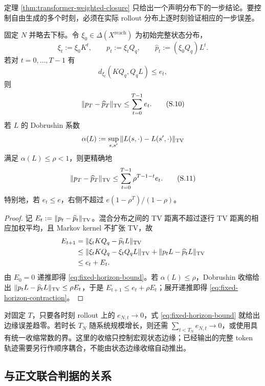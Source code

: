 定理 \ref{thm:transformer-weighted-closure} 只给出一个声明分布下的一步结论。要控制自由生成的多个时刻，必须在实际 rollout 分布上逐时刻验证相应的一步误差。

\begin{proposition}[固定时长的宏观状态边缘]
\label{prop:transformer-fixed-horizon}
固定 $N$ 并略去下标。令 $\xi_0\in\Delta(X^{\mathrm{reach}})$ 为初始完整状态分布，
\[
 \xi_t:=\xi_0K^t,
 \qquad p_t:=\xi_tQ_q,
 \qquad \widehat p_t:=(\xi_0Q_q)L^t.
\]
若对 $t=0,\ldots,T-1$ 有
\[
 d_{\xi_t}(KQ_q,Q_qL)\le e_t,
 \tag{S.9}\label{eq:rollout-one-step}
\]
则
\[
 \|p_T-\widehat p_T\|_{\operatorname{TV}}
 \le\sum_{t=0}^{T-1}e_t.
 \tag{S.10}\label{eq:fixed-horizon-bound}
\]
若 $L$ 的 Dobrushin 系数
\[
 \alpha(L):=\sup_{s,s'}\|L(s,\cdot)-L(s',\cdot)\|_{\operatorname{TV}}
\]
满足 $\alpha(L)\le\rho<1$，则更精确地
\[
 \|p_T-\widehat p_T\|_{\operatorname{TV}}
 \le\sum_{t=0}^{T-1}\rho^{T-1-t}e_t.
 \tag{S.11}\label{eq:fixed-horizon-contraction}
\]
特别地，若 $e_t\le e$，右侧不超过
$e(1-\rho^T)/(1-\rho)$。
\end{proposition}

\begin{proof}
记 $E_t:=\|p_t-\widehat p_t\|_{\operatorname{TV}}$。混合分布之间的 TV 距离不超过逐行 TV 距离的相应加权平均，且 Markov kernel 不扩张 TV，故
\[
 \begin{aligned}
 E_{t+1}
 &=\|\xi_tKQ_q-\widehat p_tL\|_{\operatorname{TV}}\\
 &\le\|\xi_tKQ_q-\xi_tQ_qL\|_{\operatorname{TV}}
     +\|p_tL-\widehat p_tL\|_{\operatorname{TV}}\\
 &\le e_t+E_t.
 \end{aligned}
\]
由 $E_0=0$ 递推即得 \eqref{eq:fixed-horizon-bound}。若
$\alpha(L)\le\rho$，Dobrushin 收缩给出
$\|p_tL-\widehat p_tL\|_{\operatorname{TV}}\le\rho E_t$，于是
$E_{t+1}\le e_t+\rho E_t$；展开递推即得
\eqref{eq:fixed-horizon-contraction}。
\end{proof}

\begin{remark}[固定时长与增长时长]
对固定 $T$，只要各时刻 rollout 上的 $e_{N,t}\to0$，式
\eqref{eq:fixed-horizon-bound} 就给出边缘误差趋零。若时长 $T_N$ 随系统规模增长，则还需
$\sum_{t<T_N}e_{N,t}\to0$，或使用具有统一收缩常数的界。这里的收缩只控制宏观状态边缘；已经输出的完整 token 轨迹需要另行作顺序耦合，不能由状态边缘收缩自动推出。
\end{remark}

\subsection{与正文联合判据的关系}
\label{sec:transformer-gamma-relation}

